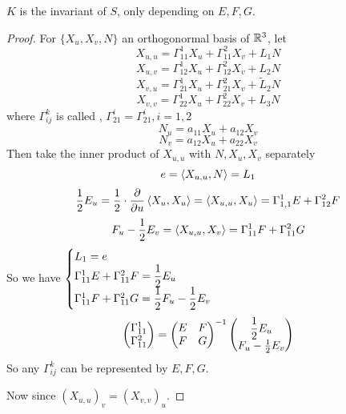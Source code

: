 \begin{theorem}\label{Gauss fantanstic theorem}
    $ K  $ is the invariant of  $ S $, only depending on  $ E,F,G $.  
\end{theorem}
\begin{proof}
    For  $ \{X_u,X_v,N\} $ an orthogonormal basis of  $ \mathbb R^3 $, let 
    \[X_{u,u}=\Gamma^1_{11}X_u+\Gamma_{11}^2X_v+L_1N\]
    \[X_{u,v}=\Gamma_{12}^1X_u+\Gamma_{12}^2X_v+L_2N\]  
    \[X_{v,u}=\Gamma_{21}^1X_u+\Gamma_{21}^2X_v+\tilde{L}_2N\]
    \[X_{v,v}=\Gamma_{22}^1X_u+\Gamma_{22}^2X_v+L_3N\]
    where  $ \Gamma_{ij}^k $ is called ,  $ \Gamma_{21}^i=\Gamma_{21}^i,i=1,2 $ 
    \[N_u=a_{11}X_u+a_{12}X_v\]
    \[N_v=a_{12}X_u+a_{22}X_v\]
    Then take the inner product of  $ X_{u,u} $ with  $ N,X_u,X_v $ separately  
    \[e=\left<X_{u,u},N\right>=L_1\]
    \[\frac{1}{2}E_u=\frac{1}{2}\cdot\frac{\partial }{\partial u}\left<X_u,X_u\right>=\left<X_{u,u},X_u\right>=\Gamma_{1,1}^1E+\Gamma_{12}^2F\]
    \[F_u-\frac{1}{2}E_v=\left<X_{u,u},X_v\right>=\Gamma_{11}^1F+\Gamma_{11}^2G\]
    So we have  $ \begin{cases}
        L_1=e\\
        \Gamma_{11}^1E+\Gamma_{11}^2F=\displaystyle\frac{1}{2}E_u\\
        \Gamma_{11}^1F+\Gamma_{11}^2G=\displaystyle\frac{1}{2}F_u-\frac{1}{2}E_v
    \end{cases} $ \ie 
    \begin{equation}
        \begin{pmatrix}
            \Gamma_{11}^1\\
            \Gamma_{11}^2
        \end{pmatrix}=\begin{pmatrix}
            E&F\\
            F&G
        \end{pmatrix}^{-1}\begin{pmatrix}
            \displaystyle\frac{1}{2}E_u\\
            F_u-\frac{1}{2}E_v
        \end{pmatrix}
    \end{equation}
    So any  $ \Gamma_{ij}^k $ can be represented by  $ E,F,G $.
    
    Now since   $ (X_{u,u})_v=(X_{v,v})_u $.
    

\end{proof}
